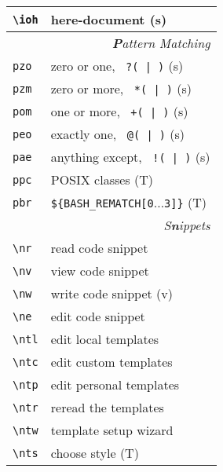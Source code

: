 \documentclass[oneside,11pt,landscape,DIV16]{scrartcl}
\begin{document}
\begin{multicols}{3}
\begin{center}
\begin{tabular}[]{|p{11mm}|p{60mm}|}
\hline \verb'\ioh'   & here-document                    \hfill (s)\\
\hline
%
\hline
\multicolumn{2}{|r|}{\textsl{\textbf{P}attern Matching}}     \\[1.0ex]
\hline     \verb'pzo' & zero or one,      \verb' ?( | )'  \hfill (s)\\ 
\hline     \verb'pzm' & zero or more,     \verb' *( | )'  \hfill (s)\\ 
\hline     \verb'pom' & one or more,      \verb' +( | )'  \hfill (s)\\ 
\hline     \verb'peo' & exactly one,      \verb' @( | )'  \hfill (s)\\ 
\hline     \verb'pae' & anything except,  \verb' !( | )'  \hfill (s)\\ 
\hline     \verb'ppc' & POSIX classes                     \hfill (T)\\ 
\hline     \verb'pbr' &  \verb'${BASH_REMATCH[0'$\ldots$\verb'3]}'  \hfill (T)\\ 
\hline
%
\hline
\multicolumn{2}{|r|}{\textsl{S\textbf{n}ippets}}               \\[1.0ex]
\hline \verb'\nr'  & read code snippet         \\
\hline \verb'\nv'  & view code snippet         \\
\hline \verb'\nw'  & write code snippet        \hfill (v)\\
\hline \verb'\ne'  & edit code snippet         \\
%
\hline \verb'\ntl' & edit local templates      \\
\hline \verb'\ntc' & edit custom templates     \\
\hline \verb'\ntp' & edit personal templates   \\
\hline \verb'\ntr' & reread the templates      \\
\hline \verb'\ntw' & template setup wizard     \\
\hline \verb'\nts' & choose style              \hfill (T)\\
\hline

\end{tabular}
\end{center}
\end{multicols}
\end{document}
